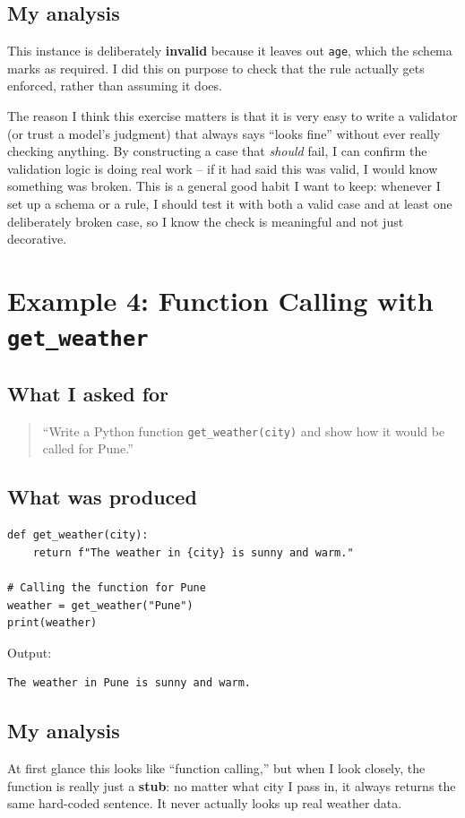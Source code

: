 \documentclass[11pt]{article}
\begin{document}
\subsection{My analysis}
This instance is deliberately \textbf{invalid} because it leaves out \texttt{age}, which the schema marks as required. I did this on purpose to check that the rule actually gets enforced, rather than assuming it does.

The reason I think this exercise matters is that it is very easy to write a validator (or trust a model's judgment) that always says ``looks fine'' without ever really checking anything. By constructing a case that \emph{should} fail, I can confirm the validation logic is doing real work -- if it had said this was valid, I would know something was broken. This is a general good habit I want to keep: whenever I set up a schema or a rule, I should test it with both a valid case and at least one deliberately broken case, so I know the check is meaningful and not just decorative.

\section{Example 4: Function Calling with \texttt{get\_weather}}

\subsection{What I asked for}
\begin{quote}
``Write a Python function \texttt{get\_weather(city)} and show how it would be called for Pune.''
\end{quote}

\subsection{What was produced}
\begin{lstlisting}
def get_weather(city):
    return f"The weather in {city} is sunny and warm."

# Calling the function for Pune
weather = get_weather("Pune")
print(weather)
\end{lstlisting}
Output:
\begin{lstlisting}
The weather in Pune is sunny and warm.
\end{lstlisting}

\subsection{My analysis}
At first glance this looks like ``function calling,'' but when I look closely, the function is really just a \textbf{stub}: no matter what city I pass in, it always returns the same hard-coded sentence. It never actually looks up real weather data.
\end{document}
